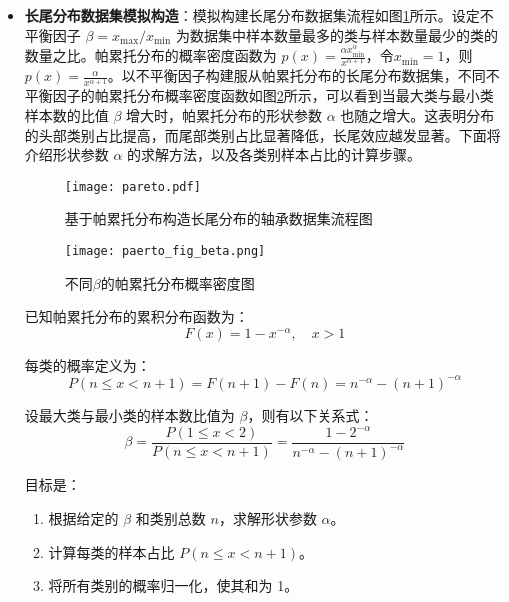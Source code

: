\documentclass[master]{thesis-uestc}
\begin{document}
\begin{itemize}
    \item \textbf{长尾分布数据集模拟构造}：模拟构建长尾分布数据集流程如图\ref{pareto}所示。设定不平衡因子 \(\beta = x_{\text{max}} / x_{\text{min}}\) 为数据集中样本数量最多的类与样本数量最少的类的数量之比。帕累托分布的概率密度函数为 \(p(x) = \frac{\alpha x_{\text{min}}^{\alpha}}{x^{\alpha+1}}\)，令$x_{\text{min}} = 1$，则\(p(x) = \frac{\alpha}{x^{\alpha+1}}\)。以不平衡因子构建服从帕累托分布的长尾分布数据集，不同不平衡因子的帕累托分布概率密度函数如图\ref{paerto_fig_beta}所示，可以看到当最大类与最小类样本数的比值 \(\beta\) 增大时，帕累托分布的形状参数 \(\alpha\) 也随之增大。这表明分布的头部类别占比提高，而尾部类别占比显著降低，长尾效应越发显著。下面将介绍形状参数 \(\alpha\) 的求解方法，以及各类别样本占比的计算步骤。

    \begin{figure}[h]
        \centering
        \texttt{[image: pareto.pdf]}
        \caption{基于帕累托分布构造长尾分布的轴承数据集流程图}
        \label{pareto}
    \end{figure}

    \begin{figure}[h]
        \centering
        \texttt{[image: paerto\_fig\_beta.png]}
        \caption{不同$\beta$的帕累托分布概率密度图}
        \label{paerto_fig_beta}
    \end{figure}

    已知帕累托分布的累积分布函数为：
    \begin{equation}
    F(x) = 1 - x^{-\alpha}, \quad x > 1
    \end{equation}

    每类的概率定义为：
    \begin{equation}
    P(n \leq x < n+1) = F(n+1) - F(n) = n^{-\alpha} - (n+1)^{-\alpha}
    \end{equation}

    设最大类与最小类的样本数比值为 $\beta$，则有以下关系式：
    \begin{equation}
    \beta = \frac{P(1 \leq x < 2)}{P(n \leq x < n+1)} = \frac{1 - 2^{-\alpha}}{n^{-\alpha} - (n+1)^{-\alpha}}
    \end{equation}

    目标是：
    \begin{enumerate}
        \item 根据给定的 $\beta$ 和类别总数 $n$，求解形状参数 $\alpha$。
        \item 计算每类的样本占比 $P(n \leq x < n+1)$。
        \item 将所有类别的概率归一化，使其和为 1。
    \end{enumerate}


\end{itemize}
\end{document}
